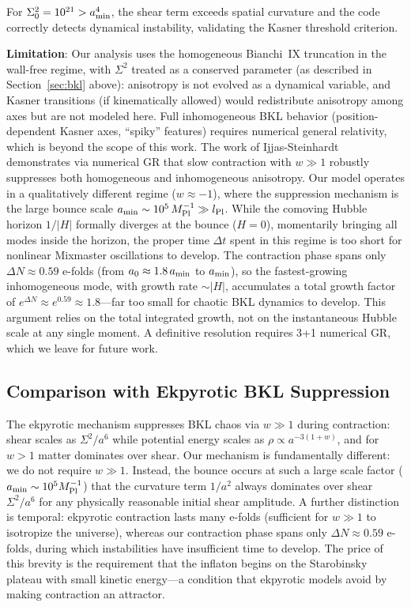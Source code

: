\documentclass[11pt,a4paper]{article}
\begin{document}
For $\Sigma^2_0 = 10^{21} > a_{\rm min}^4$, the shear term exceeds spatial curvature and the code correctly detects dynamical instability, validating the Kasner threshold criterion.

\begin{assumption_box}
\textbf{Limitation}: Our analysis uses the homogeneous Bianchi~IX truncation in the wall-free regime, with $\Sigma^2$ treated as a conserved parameter (as described in Section~\ref{sec:bkl} above): anisotropy is not evolved as a dynamical variable, and Kasner transitions (if kinematically allowed) would redistribute anisotropy among axes but are not modeled here.  Full inhomogeneous BKL behavior (position-dependent Kasner axes, ``spiky'' features) requires numerical general relativity, which is beyond the scope of this work. The work of Ijjas-Steinhardt \cite{Ijjas2017,Cook2020} demonstrates via numerical GR that slow contraction with $w \gg 1$ robustly suppresses both homogeneous and inhomogeneous anisotropy. Our model operates in a qualitatively different regime ($w \approx -1$), where the suppression mechanism is the large bounce scale $a_{\rm min} \sim 10^5\,M_{\rm Pl}^{-1} \gg l_{\rm Pl}$. While the comoving Hubble horizon $1/|H|$ formally diverges at the bounce ($H = 0$), momentarily bringing all modes inside the horizon, the proper time $\Delta t$ spent in this regime is too short for nonlinear Mixmaster oscillations to develop. The contraction phase spans only $\Delta N \approx 0.59$ e-folds (from $a_0 \approx 1.8\,a_{\rm min}$ to $a_{\rm min}$), so the fastest-growing inhomogeneous mode, with growth rate $\sim |H|$, accumulates a total growth factor of $e^{\Delta N} \approx e^{0.59} \approx 1.8$---far too small for chaotic BKL dynamics to develop. This argument relies on the total integrated growth, not on the instantaneous Hubble scale at any single moment. A definitive resolution requires 3+1 numerical GR, which we leave for future work.
\end{assumption_box}

\subsection{Comparison with Ekpyrotic BKL Suppression}

The ekpyrotic mechanism \cite{Erickson2004} suppresses BKL chaos via $w \gg 1$ during contraction: shear scales as $\Sigma^2/a^6$ while potential energy scales as $\rho \propto a^{-3(1+w)}$, and for $w > 1$ matter dominates over shear. Our mechanism is fundamentally different: we do not require $w \gg 1$. Instead, the bounce occurs at such a large scale factor ($a_{\rm min} \sim 10^5 M_{\rm Pl}^{-1}$) that the curvature term $1/a^2$ always dominates over shear $\Sigma^2/a^6$ for any physically reasonable initial shear amplitude. A further distinction is temporal: ekpyrotic contraction lasts many e-folds (sufficient for $w \gg 1$ to isotropize the universe), whereas our contraction phase spans only $\Delta N \approx 0.59$ e-folds, during which instabilities have insufficient time to develop. The price of this brevity is the requirement that the inflaton begins on the Starobinsky plateau with small kinetic energy---a condition that ekpyrotic models avoid by making contraction an attractor.
\end{document}
